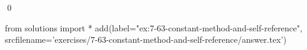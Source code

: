 
\begin{ex}
  \label{ex:7-63-constant-method-and-self-reference}
  
  \qed
\end{ex}
\begin{python0}
from solutions import *
add(label="ex:7-63-constant-method-and-self-reference",
    srcfilename='exercises/7-63-constant-method-and-self-reference/answer.tex')
\end{python0}
